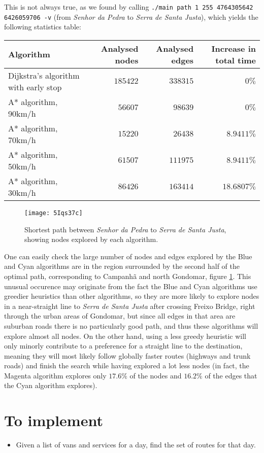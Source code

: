 This is not always true, as we found by calling \texttt{./main path 1 255 4764305642 6426059706 -v} (from \textit{Senhor da Pedra} to \textit{Serra de Santa Justa}), which yields the following statistics table:
\begin{center}
    \begin{tabular}{l | r | r | r}
        Algorithm                                & Analysed nodes & Analysed edges & Increase in total time \\ \hline
            Dijkstra's algorithm with early stop &       $185422$ &       $338315$ &            $      0\%$ \\
                            A* algorithm, 90km/h &       $ 56607$ &       $ 98639$ &            $      0\%$ \\
                            A* algorithm, 70km/h &       $ 15220$ &       $ 26438$ &            $ 8.9411\%$ \\
                            A* algorithm, 50km/h &       $ 61507$ &       $111975$ &            $ 8.9411\%$ \\
                            A* algorithm, 30km/h &       $ 86426$ &       $163414$ &            $18.6807\%$ \\
    \end{tabular}
\end{center}
\begin{figure}[h]
    \centering
    \texttt{[image: 5Iqs37c]}
    \caption{Shortest path between \textit{Senhor da Pedra} to \textit{Serra de Santa Justa}, showing nodes explored by each algorithm.}
    \label{fig:srpedra-stajusta}
\end{figure}
One can easily check the large number of nodes and edges explored by the Blue and Cyan algorithms are in the region surrounded by the second half of the optimal path, corresponding to Campanhã and north Gondomar, figure \ref{fig:srpedra-stajusta}. This unusual occurence may originate from the fact the Blue and Cyan algorithms use greedier heuristics than other algorithms, so they are more likely to explore nodes in a near-straight line to \textit{Serra de Santa Justa} after crossing Freixo Bridge, right through the urban areas of Gondomar, but since all edges in that area are suburban roads there is no particularly good path, and thus these algorithms will explore almost all nodes. On the other hand, using a less greedy heuristic will only minorly contribute to a preference for a straight line to the destination, meaning they will most likely follow globally faster routes (highways and trunk roads) and finish the search while having explored a lot less nodes (in fact, the Magenta algorithm explores only $17.6\%$ of the nodes and $16.2\%$ of the edges that the Cyan algorithm explores).
\section{To implement}
\begin{itemize}
    \item Given a list of vans and services for a day, find the set of routes for that day.
\end{itemize}
